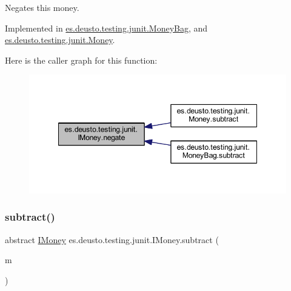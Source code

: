 Negates this money. 

Implemented in \mbox{\hyperlink{classes_1_1deusto_1_1testing_1_1junit_1_1_money_bag_abf06bf97e548f95038756608fe0c8351}{es.\+deusto.\+testing.\+junit.\+Money\+Bag}}, and \mbox{\hyperlink{classes_1_1deusto_1_1testing_1_1junit_1_1_money_ae5f0bc3ea87f1fd55d6478653b8f2e36}{es.\+deusto.\+testing.\+junit.\+Money}}.

Here is the caller graph for this function\+:\nopagebreak
\begin{figure}[H]
\begin{center}
\leavevmode
\includegraphics[width=348pt]{interfacees_1_1deusto_1_1testing_1_1junit_1_1_i_money_a741967d7aa89055b6873619303b11385_icgraph}
\end{center}
\end{figure}
\mbox{\label{interfacees_1_1deusto_1_1testing_1_1junit_1_1_i_money_a1fb4981aa759e3fe0679654bec7a8b61}} 
\subsubsection{\texorpdfstring{subtract()}{subtract()}}
{\footnotesize\ttfamily abstract \mbox{\hyperlink{interfacees_1_1deusto_1_1testing_1_1junit_1_1_i_money}{I\+Money}} es.\+deusto.\+testing.\+junit.\+I\+Money.\+subtract (\begin{DoxyParamCaption}\item[{\mbox{\hyperlink{interfacees_1_1deusto_1_1testing_1_1junit_1_1_i_money}{I\+Money}}}]{m }\end{DoxyParamCaption})\hspace{0.3cm}{\ttfamily [abstract]}}

